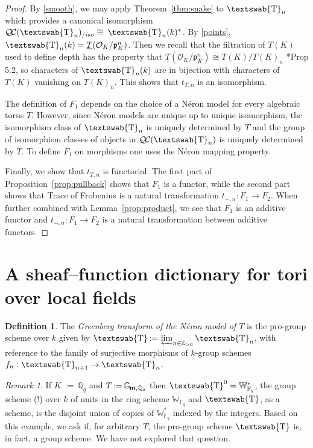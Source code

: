\documentclass[11pt]{amsart}
\newcommand{\mathswab}[1]{\operatorname{\textswab{#1}}}
\theoremstyle{plain}
\theoremstyle{definition}
\newtheorem{definition}[theorem]{Definition}
\theoremstyle{remark}
\newtheorem{remark}[theorem]{Remark}
\newcommand{\FF}{{\mathbb{F}}}
\newcommand{\ZZ}{{\mathbb{Z}}}
\newcommand{\OK}{\mathcal{O}_K}
\newcommand{\pK}{\mathfrak{p}_K}
\newcommand{\Fq}{k}
\newcommand{\cdef}[1]{ {#1}\index{#1} }
\newcommand{\ceq}{{\, :=\, }}
\newcommand{\iso}{{\ \cong\ }}
\newcommand{\Gm}[1]{\mathbb{G}_{\hskip-1pt\textbf{m},#1}}
\newcommand{\GN}[1]{\mathswab{#1}}
\newcommand{\TT}{\underline{T}}
\newcommand{\QC}{{\mathcal{Q\hskip-0.8pt C}}}
\newcommand{\QCiso}[1]{\QC(#1)_{/\textit{iso}}}
\newcommand{\trFrob}[1]{t_{#1}}
\begin{document}
\begin{proof}
  By \ref{smooth}, we may apply Theorem~\ref{thm:snake} to
  $\GN{T}_n$ which provides a canonical isomorphism
  $\QCiso{\GN{T}_n} \iso \GN{T}_n(\Fq)^*$.
  By \ref{points}, $\GN{T}_n(\Fq) = \TT(\OK/\pK^n)$.
  Then we recall that the filtration of $T(K)$ used to
  define depth has the property that $\TT(\OK/\pK^n) \cong T(K) / T(K)_n$
  \cite{yu:03a}*{Prop 5.2}, so characters of $\GN{T}_n(\Fq)$ 
  are in bijection with characters of $T(K)$ vanishing on $T(K)_n$. 
  This shows that $\trFrob{T,n}$ is an isomorphism.

  The definition of $F_1$ depends 
  on the choice of a Néron model for every algebraic torus $T$.
  However, since Néron models are unique up to unique isomorphism,
  the isomorphism class of $\GN{T}_n$ is uniquely determined by $T$
  and the group of isomorphism classes of objects in $\QC(\GN{T}_n)$ 
  is uniquely determined by $T$. 
  To define $F_1$ on morphisms one uses the Néron mapping property.
  
  Finally, we show that $\trFrob{T,n}$ is functorial.
The first part of Proposition~\ref{prop:pullback} shows that $F_1$ is a functor,
while the second part shows that Trace of Frobenius is a natural transformation
$t_{ - ,n} : F_1 \to F_2$. When further combined with Lemma~\ref{prop:product},
we see that $F_1$ is an additive functor and $t_{ - ,n}: F_1 \to F_2$ is a
natural transformation between additive functors.
\end{proof}


\section{A sheaf--function dictionary for tori over local fields} \label{sec:quasichar} 


\begin{definition}\label{def:objGN}
The \emph{Greenberg transform of the N\'eron model of $T$} 
is the pro-group scheme over $\Fq$ given by 
$\cdef{\GN{T}} \ceq \varprojlim_{n\in \ZZ_{>0}} \GN{T}_{n}$, 
with reference to the family of  surjective morphisms of 
$\Fq$-group schemes $f_n : \GN{T}_{n+1} \to \GN{T}_n$.
\end{definition}

\begin{remark}
If $K \ceq \mathbb{Q}_q$ and 
$T \ceq \Gm{\mathbb{Q}_q}$ then $\GN{T}^0 = \mathbb{W}^*_{\FF_q}$, 
the group scheme (!) over $\Fq$ of units in the ring scheme $\mathbb{W}_{\FF_q}$
and $\GN{T}$, as a scheme, is the disjoint union of copies of $\mathbb{W}^*_{\FF_q}$
indexed by the integers. Based on this example, 
we ask if, for arbitrary $T$, the pro-group scheme $\GN{T}$ is, in fact, a group scheme.
We have not explored that question.
\end{remark}
\end{document}
